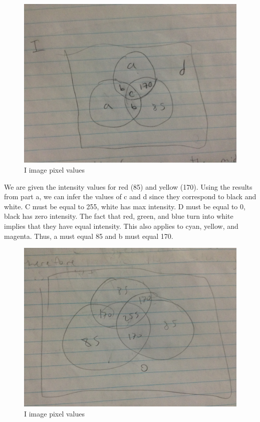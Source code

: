 \documentclass{article}
\begin{document}
	\begin{figure}[H]
		\includegraphics[width=\linewidth]{6.16/fig5.JPG}
		\caption{I image pixel values}
	\end{figure}
	
	We are given the intensity values for red (85) and yellow (170). Using the results from part a, we can infer the values of c and d since they correspond to black and white. C must be equal to 255, white has max intensity. D must be equal to 0, black has zero intensity. The fact that red, green, and blue turn into white implies that they have equal intensity. This also applies to cyan, yellow, and magenta. Thus, a must equal 85 and b must equal 170.
	
	\begin{figure}[H]
		\includegraphics[width=\linewidth]{6.16/fig6.JPG}
		\caption{I image pixel values}
	\end{figure}
	
\end{document}

